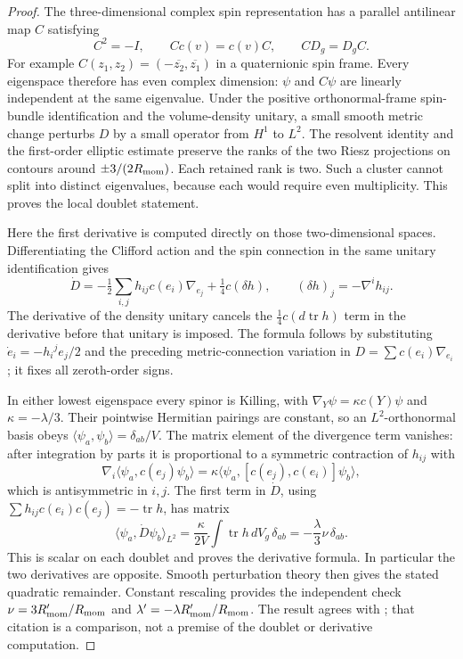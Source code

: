 \documentclass[11pt]{article}
\begin{document}
\begin{proof}
The three-dimensional complex spin representation has a parallel
antilinear map \(C\) satisfying
\[
 C^2=-I,\qquad Cc(v)=c(v)C,\qquad CD_g=D_gC.
\]
For example \(C(z_1,z_2)=(-\overline{z_2},\overline{z_1})\) in a
quaternionic spin frame.  Every eigenspace therefore has even complex
dimension: \(\psi\) and \(C\psi\) are linearly independent at the same
eigenvalue.  Under the positive orthonormal-frame spin-bundle
identification and the volume-density unitary, a small smooth metric
change perturbs \(D\) by a small operator from \(H^1\) to \(L^2\).
The resolvent identity and the first-order elliptic estimate preserve the
ranks of the two Riesz projections on contours around
\(\pm3/(2R_{\mathrm{mom}})\).  Each retained rank is two.  Such a cluster cannot
split into distinct eigenvalues, because each would require even
multiplicity.  This proves the local doublet statement.

Here the first derivative is computed directly on those two-dimensional
spaces.  Differentiating the Clifford action and the spin connection in
the same unitary identification gives
\[
 \dot D=-\tfrac12\sum_{i,j}h_{ij}c(e_i)\nabla_{e_j}
             +\tfrac14c(\delta h),
 \qquad (\delta h)_j=-\nabla^i h_{ij}.
\]
The derivative of the density unitary cancels the
\(\tfrac14c(d\operatorname{tr}h)\) term in the derivative before that
unitary is imposed.  The formula follows by substituting
\(\dot e_i=-h_i{}^j e_j/2\) and the preceding metric-connection variation
in \(D=\sum c(e_i)\nabla_{e_i}\); it fixes all zeroth-order signs.

In either lowest eigenspace every spinor is Killing, with
\(\nabla_Y\psi=\kappa c(Y)\psi\) and \(\kappa=-\lambda/3\).
Their pointwise Hermitian pairings are constant, so an \(L^2\)-orthonormal
basis obeys \(\langle\psi_a,\psi_b\rangle=\delta_{ab}/V\).
The matrix element of the divergence term vanishes: after integration by
parts it is proportional to a symmetric contraction of \(h_{ij}\) with
\[
 \nabla_i\langle\psi_a,c(e_j)\psi_b\rangle
 =\kappa\langle\psi_a,[c(e_j),c(e_i)]\psi_b\rangle,
\]
which is antisymmetric in \(i,j\).  The first term in \(\dot D\), using
\(\sum h_{ij}c(e_i)c(e_j)=-\operatorname{tr}h\), has matrix
\[
 \langle\psi_a,\dot D\psi_b\rangle_{L^2}
 =\frac{\kappa}{2V}\int\operatorname{tr}h\,dV_g\,\delta_{ab}
 =-\frac{\lambda}{3}\nu\,\delta_{ab}.
\]
This is scalar on each doublet and proves the derivative formula.  In
particular the two derivatives are opposite.  Smooth perturbation theory
then gives the stated quadratic remainder.  Constant rescaling provides
the independent check \(\nu=3R_{\mathrm{mom}}'/R_{\mathrm{mom}}\) and
\(\lambda'=-\lambda R_{\mathrm{mom}}'/R_{\mathrm{mom}}\).  The result agrees with
\cite{fangLevitinVassiliev2018DiracS3}; that citation is a comparison, not
a premise of the doublet or derivative computation.
\end{proof}
\end{document}
